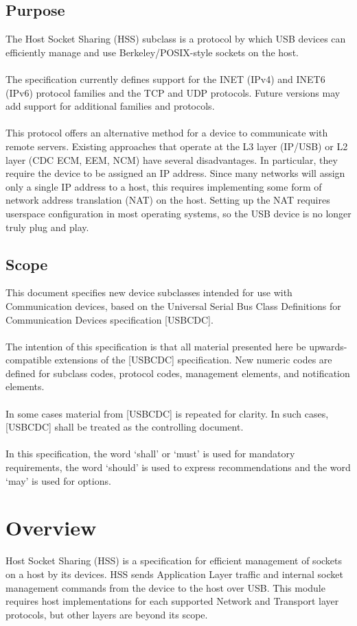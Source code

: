 \documentclass[10pt]{article}
\begin{document}
	\subsection{Purpose}
	The Host Socket Sharing (HSS) subclass is a protocol by which USB devices can efficiently manage and use Berkeley/POSIX-style sockets on the host.\\
	\\
	The specification currently defines support for the INET (IPv4) and INET6 (IPv6) protocol families and the TCP and UDP protocols. Future versions may add support for additional families and protocols.\\
	\\
	This protocol offers an alternative method for a device to communicate with remote servers. Existing approaches that operate at the L3 layer (IP/USB) or L2 layer (CDC ECM, EEM, NCM) have several disadvantages.  In particular, they require the device to be assigned an IP address.  Since many networks will assign only a single IP address to a host, this requires implementing some form of network address translation (NAT) on the host.  Setting up the NAT requires userspace configuration in most operating systems, so the USB device is no longer truly plug and play.
	\subsection{Scope}
	This document specifies new device subclasses intended for use with Communication devices,
	based on the Universal Serial Bus Class Definitions for Communication Devices specification
	[USBCDC]. \\
	\\
	The intention of this specification is that all material presented here be upwards-compatible
	extensions of the [USBCDC] specification. New numeric codes are defined for subclass codes,
	protocol codes, management elements, and notification elements. \\
	\\
	In some cases material from [USBCDC] is repeated for clarity. In such cases, [USBCDC] shall be
	treated as the controlling document. \\
	\\
	In this specification, the word ‘shall’ or ‘must’ is used for mandatory requirements, the word
	‘should’ is used to express recommendations and the word ‘may’ is used for options. 
	\section{Overview}
	Host Socket Sharing (HSS) is a specification for efficient management of sockets on a host by its devices. HSS sends Application Layer traffic and internal socket management commands from the device to the host over USB. This module requires host implementations for each supported Network and Transport layer protocols, but other layers are beyond its scope.
\end{document}
